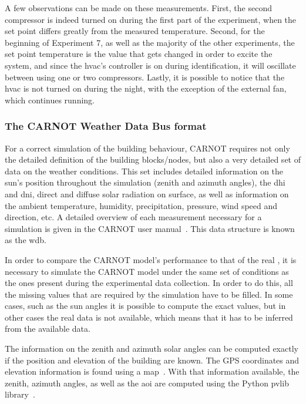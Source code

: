 A few observations can be made on these measurements. First, the second
compressor is indeed turned on during the first part of the experiment, when the
set point differs greatly from the measured temperature. Second, for the
beginning of Experiment 7, as well as the majority of the other experiments, the
set point temperature is the value that gets changed in order to excite the
system, and since the \acrshort{hvac}'s controller is on during identification,
it will oscillate between using one or two compressors. Lastly, it is possible
to notice that the \acrshort{hvac} is not turned on during the night, with the
exception of the external fan, which continues running.

\subsubsection{The CARNOT Weather Data Bus format}\label{sec:CARNOT_WDB}

For a correct simulation of the building behaviour, CARNOT requires not only the
detailed definition of the building blocks/nodes, but also a very detailed set
of data on the weather conditions. This set includes detailed information on the
sun's position throughout the simulation (zenith and azimuth angles), the
\acrfull{dhi} and \acrfull{dni}, direct and diffuse solar radiation on surface,
as well as information on the ambient temperature, humidity, precipitation,
pressure, wind speed and direction, etc.  A detailed overview of each
measurement necessary for a simulation is given in the CARNOT user
manual~\cite{CARNOTManual}. This data structure is known as the \acrfull{wdb}.

In order to compare the CARNOT model's performance to that of the real \pdome,
it is necessary to simulate the CARNOT model under the same set of conditions as
the ones present during the experimental data collection. In order to do this,
all the missing values that are required by the simulation have to be filled. In
some cases, such as the sun angles it is possible to compute the exact values,
but in other cases the real data is not available, which means that it has to be
inferred from the available data.

The information on the zenith and azimuth solar angles can be computed exactly
if the position and elevation of the building are known. The GPS coordinates and
elevation information is found using a map~\cite{ElevationFinder}. With that
information available, the zenith, azimuth angles, as well as the \acrfull{aoi}
are computed using the Python pvlib
library~\cite{f.holmgrenPvlibPythonPython2018}.

